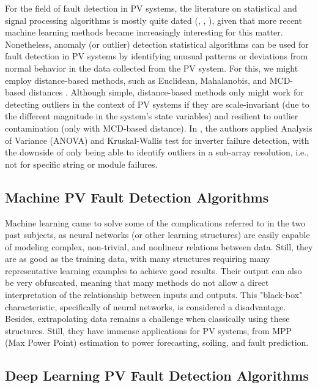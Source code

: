 
For the field of fault detection in PV systems, the literature on statistical and signal processing algorithms is mostly quite dated (\cite{Buddha2012}, \cite{Zhao2014}, \cite{Vergura2008}), given that more recent machine learning methods became increasingly interesting for this matter. Nonetheless, anomaly (or outlier) detection statistical algorithms can be used for fault detection in PV systems by identifying unusual patterns or deviations from normal behavior in the data collected from the PV system. For this, we might employ distance-based methods, such as Euclidean, Mahalanobis, and MCD-based distances \cite{Braun2011}. Although simple, distance-based methods only might work for detecting outliers in the context of PV systems if they are scale-invariant (due to the different magnitude in the system's state variables) and resilient to outlier contamination (only with MCD-based distance). In  \cite{Vergura2008}, the authors applied Analysis of Variance (ANOVA) and Kruskal-Wallis test for inverter failure detection, with the downside of only being able to identify outliers in a sub-array resolution, i.e., not for specific string or module failures.


\subsection{Machine PV Fault Detection Algorithms}

Machine learning came to solve some of the complications referred to in the two past subjects, as neural networks (or other learning structures) are easily capable of modeling complex, non-trivial, and nonlinear relations between data. Still, they are as good as the training data, with many structures requiring many representative learning examples to achieve good results. Their output can also be very obfuscated, meaning that many methods do not allow a direct interpretation of the relationship between inputs and outputs. This "black-box" characteristic, specifically of neural networks, is considered a disadvantage. Besides, extrapolating data remains a challenge when classically using these structures. Still, they have immense applications for PV systems, from MPP (Max Power Point) estimation to power forecasting, soiling, and fault prediction.

\subsection{Deep Learning PV Fault Detection Algorithms}

